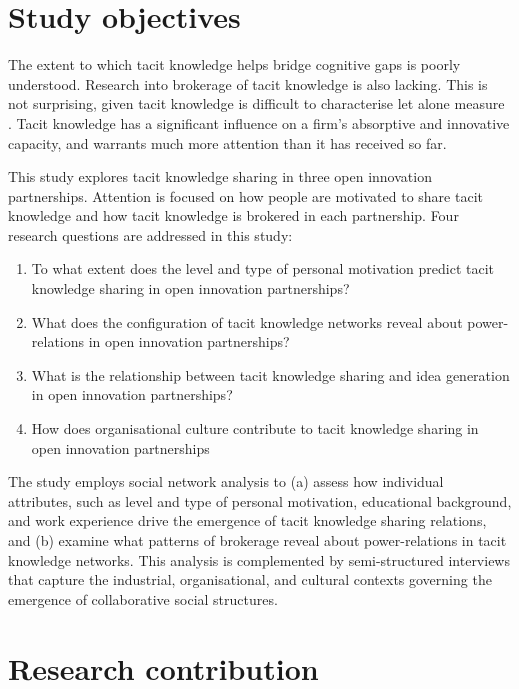 \section{Study objectives}

The extent to which tacit knowledge helps bridge cognitive gaps is poorly understood. Research into brokerage of tacit knowledge is also lacking. This is not surprising, given tacit knowledge is difficult to characterise let alone measure \citep{zander1995knowledge,cavusgil2003tacit}. Tacit knowledge has a significant influence on a firm's absorptive and innovative capacity, and warrants much more attention than it has received so far. \medskip

This study explores tacit knowledge sharing in three open innovation partnerships. Attention is focused on how people are motivated to share tacit knowledge and how tacit knowledge is brokered in each partnership. Four research questions are addressed in this study: \medskip

\begin{description}
    \begin{enumerate}
        \item To what extent does the level and type of personal motivation predict tacit knowledge sharing in open innovation partnerships?
	    \item What does the configuration of tacit knowledge networks reveal about power-relations in open innovation partnerships?
	    \item What is the relationship between tacit knowledge sharing and idea generation in open innovation partnerships?
	   \item How does organisational culture contribute to tacit knowledge sharing in open innovation partnerships
    \end{enumerate}
\end{description}

The study employs social network analysis to (a) assess how individual attributes, such as level and type of personal motivation, educational background, and work experience drive the emergence of tacit knowledge sharing relations, and (b) examine what patterns of brokerage reveal about power-relations in tacit knowledge networks. This analysis is complemented by semi-structured interviews that capture the industrial, organisational, and cultural contexts governing the emergence of collaborative social structures. \medskip  

\section{Research contribution}

